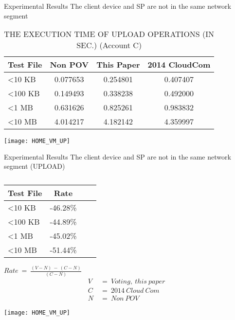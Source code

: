 \begin{frame}{Experimental Results}
{The client device and SP are \alert{not} in the same network segment}
	\scriptsize
	\begin{table}[]  
    \centering
    \caption{THE EXECUTION TIME OF \alert{UPLOAD} OPERATIONS (IN SEC.) (Account C)}
    \begin{tabular}{lccc}
        Test File        & Non POV  & This Paper & 2014 CloudCom \\ \hline
        \textless 10 KB  & 0.077653 & 0.254801   & 0.407407      \\ \hline
        \textless 100 KB & 0.149493 & 0.338238   & 0.492000      \\ \hline
        \textless 1 MB   & 0.631626 & 0.825261   & 0.983832      \\ \hline
        \textless 10 MB  & 4.014217 & 4.182142   & 4.359997      \\ \hline
    \end{tabular}
    \end{table}
	\begin{center}
	    \texttt{[image: HOME\_VM\_UP]}
    \end{center}
\end{frame}

\begin{frame}{Experimental Results}
{The client device and SP are \alert{not} in the same network segment (UPLOAD)}
	\begin{minipage}[c]{0.4\textwidth}
	\scriptsize
    \begin{table}[] 
    \centering
    \caption{}
    \begin{tabular}{lccc}
        Test File        & Rate     \\ \hline
        \textless 10 KB  & -46.28\% \\ \hline
        \textless 100 KB & -44.89\% \\ \hline
        \textless 1 MB   & -45.02\% \\ \hline
        \textless 10 MB  & -51.44\% \\ \hline
    \end{tabular}
    \end{table}
    \begin{center}
		$Rate\ =\ \frac{(V-N)\ -\ (C-N)}{(C-N)}$
        \begin{equation*} \label{eq5}
                \begin{split}
                        V\ & =\ Voting,\ this\ paper\\
                        C\ & =\ 2014\ Cloud\ Com\\
                        N\ & =\ Non\ POV
                \end{split}
        \end{equation*}
    \end{center}
    \end{minipage}%
    \begin{minipage}[c]{0.6\textwidth}
	\texttt{[image: HOME\_VM\_UP]}
    \end{minipage}
\end{frame}

